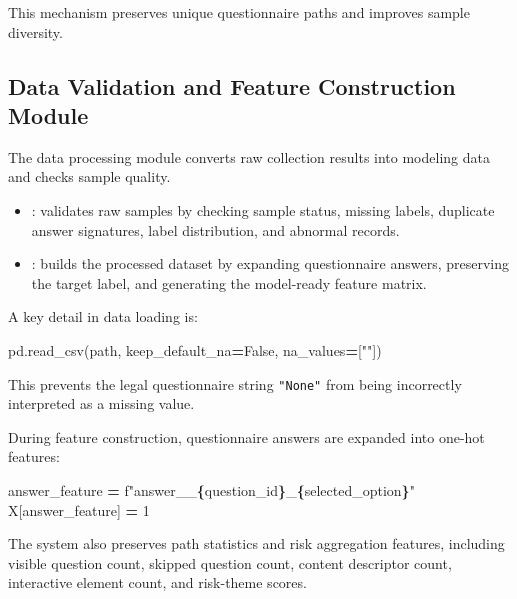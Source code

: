 \documentclass[UTF8,a4paper,12pt]{ctexart}
\newenvironment{Shaded}{\begin{snugshade}}{\end{snugshade}}
\newcommand{\DecValTok}[1]{\textcolor[rgb]{0.00,0.00,0.81}{#1}}
\newcommand{\NormalTok}[1]{#1}
\newcommand{\OperatorTok}[1]{\textcolor[rgb]{0.81,0.36,0.00}{\textbf{#1}}}
\newcommand{\SpecialCharTok}[1]{\textcolor[rgb]{0.81,0.36,0.00}{\textbf{#1}}}
\newcommand{\SpecialStringTok}[1]{\textcolor[rgb]{0.31,0.60,0.02}{#1}}
\newcommand{\StringTok}[1]{\textcolor[rgb]{0.31,0.60,0.02}{#1}}
\newcommand{\VariableTok}[1]{\textcolor[rgb]{0.00,0.00,0.00}{#1}}
\renewenvironment{Shaded}{%
    \vspace{0.35em}%
    \begin{tcolorbox}[enhanced,breakable,colback=zjucodebg,colframe=zjucodeframe,boxrule=0.45pt,leftrule=2.2pt,arc=1.6mm,left=1.8mm,right=1.8mm,top=1.2mm,bottom=1.2mm]%
  }{%
    \end{tcolorbox}%
    \vspace{0.25em}%
  }%
\providecommand{\tightlist}{%
  \setlength{\itemsep}{0pt}\setlength{\parskip}{0pt}}
\begin{document}
This mechanism preserves unique questionnaire paths and improves sample diversity.

\subsection{Data Validation and Feature Construction Module}\label{data-validation-and-feature-construction-module}

The data processing module converts raw collection results into modeling data and checks sample quality.

\begin{itemize}
\tightlist
\item
  : validates raw samples by checking sample status, missing labels, duplicate answer signatures, label distribution, and abnormal records.
\item
  : builds the processed dataset by expanding questionnaire answers, preserving the target label, and generating the model-ready feature matrix.
\end{itemize}

A key detail in data loading is:

\begin{Shaded}
\begin{Highlighting}[]
\NormalTok{pd.read\_csv(path, keep\_default\_na}\OperatorTok{=}\VariableTok{False}\NormalTok{, na\_values}\OperatorTok{=}\NormalTok{[}\StringTok{""}\NormalTok{])}
\end{Highlighting}
\end{Shaded}

This prevents the legal questionnaire string \texttt{"None"} from being incorrectly interpreted as a missing value.

During feature construction, questionnaire answers are expanded into one-hot features:

\begin{Shaded}
\begin{Highlighting}[]
\NormalTok{answer\_feature }\OperatorTok{=} \SpecialStringTok{f"answer\_\_}\SpecialCharTok{\{}\NormalTok{question\_id}\SpecialCharTok{\}}\SpecialStringTok{\_}\SpecialCharTok{\{}\NormalTok{selected\_option}\SpecialCharTok{\}}\SpecialStringTok{"}
\NormalTok{X[answer\_feature] }\OperatorTok{=} \DecValTok{1}
\end{Highlighting}
\end{Shaded}

The system also preserves path statistics and risk aggregation features, including visible question count, skipped question count, content descriptor count, interactive element count, and risk-theme scores.
\end{document}
